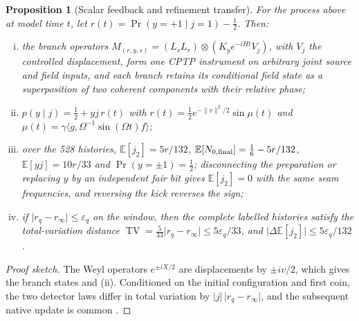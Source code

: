 \documentclass[11pt]{article}
\newtheorem{proposition}[theorem]{Proposition}
\theoremstyle{definition}
\theoremstyle{remark}
\theoremstyle{plain}
\newcommand{\Ex}{\mathbb{E}}
\newcommand{\TV}{\operatorname{TV}}
\begin{document}
\begin{proposition}[Scalar feedback and refinement transfer]
\label{prop:scalar}
For the process above at model time $t$, let
$r(t)=\Pr(y=+1\mid j=1)-\frac12$. Then:
\begin{enumerate}[(i)]
\item the branch operators
$M_{(r,y,s)}=(L_sL_r)\otimes(K_ye^{-iHt}V_j)$, with $V_j$ the controlled
displacement, form one CPTP instrument on arbitrary joint source and field
inputs, and each branch retains its conditional field state as a
superposition of two coherent components with their relative phase;
\item $p(y\mid j)=\frac12+yj\,r(t)$ with
$r(t)=\frac12e^{-\lVert v\rVert^2/2}\sin\mu(t)$ and
$\mu(t)=\gamma\langle g,\Omega^{-1}\sin(\Omega t)f\rangle$;
\item over the 528 histories, $\Ex[j_2]=5r/132$,
$\Ex[N_{0,\rm final}]=\frac16-5r/132$, $\Ex[yj]=10r/33$ and
$\Pr(y=\pm1)=\frac12$; disconnecting the preparation or replacing $y$ by an
independent fair bit gives $\Ex[j_2]=0$ with the same seam frequencies, and
reversing the kick reverses the sign;
\item if $\lvert r_q-r_\infty\rvert\le\varepsilon_q$ on the window, then the
complete labelled histories satisfy the total-variation distance $\TV=\frac5{33}\lvert r_q-r_\infty\rvert\le5\varepsilon_q/33$, and
$\lvert\Delta\Ex[j_2]\rvert\le5\varepsilon_q/132$.
\end{enumerate}
\end{proposition}

\begin{proof}[Proof sketch]
The Weyl operators $e^{\pm iX/2}$ are displacements by $\pm iv/2$, which gives
the branch states and (ii). Conditioned on the initial configuration and first
coin, the two detector laws differ in total variation by
$\lvert j\rvert\,\lvert r_q-r_\infty\rvert$, and the subsequent native update
is common \cite{sDERIV}.
\end{proof}
\end{document}
